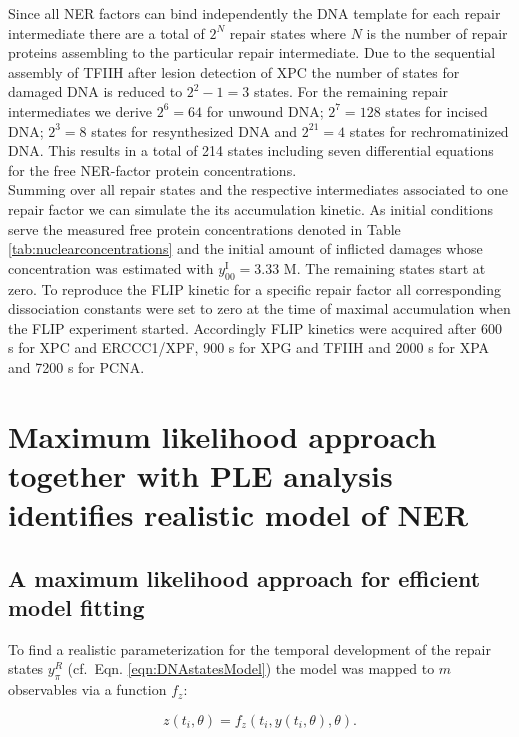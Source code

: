 Since all NER factors can bind independently the DNA template for each repair intermediate there are a total of $ 2^N $ repair states where $ N $ is the number of repair proteins assembling to the particular repair intermediate. Due to the sequential assembly of TFIIH after lesion detection of XPC the number of states for damaged DNA is reduced to $ 2^2-1 = 3$ states. For the remaining repair intermediates we derive  $ 2^6 = 64$ for unwound DNA; $ 2^7 = 128$ states for incised DNA; $ 2^3 = 8$ states for resynthesized DNA and $ 2^21 = 4$ states for rechromatinized DNA. This results in a total of 214 states including seven differential equations for the free NER-factor protein concentrations. \\
Summing over all repair states and the respective intermediates associated to one repair factor we can simulate the its accumulation kinetic. As initial conditions serve the measured free protein concentrations denoted in Table \ref{tab:nuclearconcentrations}\cite{Terstiege2010,Luijsterburg2010} and the initial amount of inflicted damages whose concentration was estimated with  $y_{00}^{\text{I}} = 3.33$ \textmu M. The remaining states start at zero. To reproduce the FLIP kinetic for a specific repair factor all corresponding dissociation constants were set to zero at the time of maximal accumulation when the FLIP experiment started. Accordingly FLIP kinetics were acquired after 600 s for XPC and ERCCC1/XPF, 900 s for XPG and TFIIH and 2000 s for XPA and 7200 s for PCNA. 

 
\section{Maximum likelihood approach together with PLE analysis identifies realistic model of NER}
\subsection{A maximum likelihood approach for efficient model fitting}
\label{sec:maximumLL}
To find a realistic parameterization for the temporal development of the repair states $y_\pi^R$ (cf.\ Eqn. \ref{eqn:DNAstatesModel}) the model was mapped to $m$ observables via a function $f_z$:

  \begin{equation}
  	z(t_i,\theta) = f_z(t_i,y(t_i,\theta),\theta).
  	\label{eqn:observable}
  \end{equation} 

